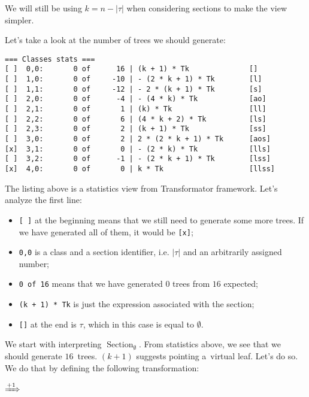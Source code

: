 \documentclass[final]{article}
\theoremstyle{definition}
\theoremstyle{definition}
\theoremstyle{remark}
\DeclareMathOperator{\tSection}{\text{Section}}
\newcommand{\includeinlinescaledsvg}[3]{\begin{minipage}{#1\textwidth}\begin{center}\end{center}\end{minipage}}
\begin{document}
We will still be using \(k = n - |\tau|\) when considering sections to make the view simpler.

Let's take a look at the number of trees we should generate:

\begin{lstlisting}
=== Classes stats ===
[ ]  0,0:       0 of      16 | (k + 1) * Tk              []
[ ]  1,0:       0 of     -10 | - (2 * k + 1) * Tk        [l]
[ ]  1,1:       0 of     -12 | - 2 * (k + 1) * Tk        [s]
[ ]  2,0:       0 of      -4 | - (4 * k) * Tk            [ao]
[ ]  2,1:       0 of       1 | (k) * Tk                  [ll]
[ ]  2,2:       0 of       6 | (4 * k + 2) * Tk          [ls]
[ ]  2,3:       0 of       2 | (k + 1) * Tk              [ss]
[ ]  3,0:       0 of       2 | 2 * (2 * k + 1) * Tk      [aos]
[x]  3,1:       0 of       0 | - (2 * k) * Tk            [lls]
[ ]  3,2:       0 of      -1 | - (2 * k + 1) * Tk        [lss]
[x]  4,0:       0 of       0 | k * Tk                    [llss]
\end{lstlisting}

The listing above is a statistics view from Transformator framework. Let's analyze the first line:
\begin{itemize}
    \item \verb|[ ]| at the beginning means that we still need to generate some more trees. If we have generated all of them, it would be \verb|[x]|;
    \item \verb|0,0| is a class and a section identifier, i.e. \(|\tau|\) and an arbitrarily assigned number;
    \item \verb|0 of 16| means that we have generated \(0\) trees from \(16\) expected;
    \item \verb|(k + 1) * Tk| is just the expression associated with the section;
    \item \verb|[]| at the end is \(\tau\), which in this case is equal to \(\emptyset\).
\end{itemize}

We start with interpreting \(\tSection_\emptyset\). From statistics above, we see that we should generate \(16\)~trees. \((k + 1)\) suggests pointing a~virtual leaf. Let's do so. We do that by defining the following transformation:

\begin{center}
    \includeinlinescaledsvg{.4}{.7}{lambda__transformations__001a}%
    \(\xRightarrow{+1}\)%
    \includeinlinescaledsvg{.4}{.7}{lambda__transformations__001b}%
\end{center}
\end{document}
